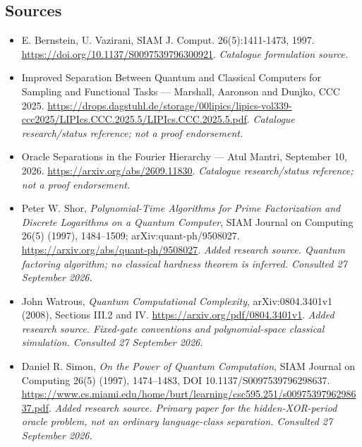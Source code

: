 \documentclass[11pt,a4paper]{article}
\begin{document}
\subsection{Sources}
\begin{itemize}\raggedright
\item[\textnormal{[S1]}]\hypertarget{source:30006683:1}{} E. Bernstein, U. Vazirani, SIAM J. Comput. 26(5):1411-1473, 1997.
\url{https://doi.org/10.1137/S0097539796300921}.
{\small\textit{Catalogue formulation source.}}
\item[\textnormal{[S2]}]\hypertarget{source:30006683:2}{} Improved Separation Between Quantum and Classical Computers for Sampling and Functional Tasks — Marshall, Aaronson and Dunjko, CCC 2025.
\url{https://drops.dagstuhl.de/storage/00lipics/lipics-vol339-ccc2025/LIPIcs.CCC.2025.5/LIPIcs.CCC.2025.5.pdf}.
{\small\textit{Catalogue research/status reference; not a proof endorsement.}}
\item[\textnormal{[S3]}]\hypertarget{source:30006683:3}{} Oracle Separations in the Fourier Hierarchy — Atul Mantri, September 10, 2026.
\url{https://arxiv.org/abs/2609.11830}.
{\small\textit{Catalogue research/status reference; not a proof endorsement.}}
\item[\textnormal{[E1]}]\hypertarget{extra:30006683:1}{} Peter W. Shor, \emph{Polynomial-Time Algorithms for Prime Factorization and Discrete Logarithms on a Quantum Computer}, SIAM Journal on Computing 26(5) (1997), 1484--1509; arXiv:quant-ph/9508027.
\url{https://arxiv.org/abs/quant-ph/9508027}.
{\small\textit{Added research source. Quantum factoring algorithm; no classical hardness theorem is inferred. Consulted 27 September 2026.}}
\item[\textnormal{[E2]}]\hypertarget{extra:30006683:2}{} John Watrous, \emph{Quantum Computational Complexity}, arXiv:0804.3401v1 (2008), Sections III.2 and IV.
\url{https://arxiv.org/pdf/0804.3401v1}.
{\small\textit{Added research source. Fixed-gate conventions and polynomial-space classical simulation. Consulted 27 September 2026.}}
\item[\textnormal{[E3]}]\hypertarget{extra:30006683:3}{} Daniel R. Simon, \emph{On the Power of Quantum Computation}, SIAM Journal on Computing 26(5) (1997), 1474--1483, DOI 10.1137/S0097539796298637.
\url{https://www.cs.miami.edu/home/burt/learning/csc595.251/s0097539796298637.pdf}.
{\small\textit{Added research source. Primary paper for the hidden-XOR-period oracle problem, not an ordinary language-class separation. Consulted 27 September 2026.}}
\end{itemize}

\end{document}

